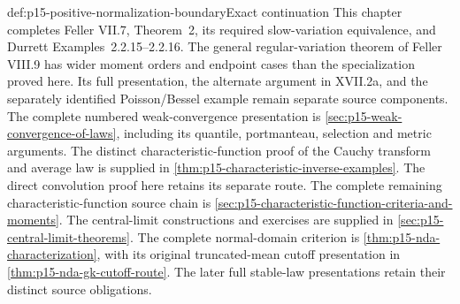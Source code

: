 \begin{proofboundary}{def:p15-positive-normalization-boundary}{Exact continuation}
This chapter completes Feller VII.7, Theorem~2, its required
slow-variation equivalence, and Durrett Examples~2.2.15--2.2.16.
The general regular-variation theorem of Feller VIII.9 has wider
moment orders and endpoint cases than the specialization proved here.
Its full presentation, the alternate argument in XVII.2a, and the
separately identified Poisson/Bessel example remain separate source
components. The complete numbered weak-convergence presentation is
\cref{sec:p15-weak-convergence-of-laws}, including its quantile,
portmanteau, selection and metric arguments.
The distinct characteristic-function proof of the Cauchy transform
and average law is supplied in
\cref{thm:p15-characteristic-inverse-examples}.
The direct convolution proof here retains its separate route.
The complete remaining characteristic-function source chain is
\cref{sec:p15-characteristic-function-criteria-and-moments}.
The central-limit constructions and exercises are supplied in
\cref{sec:p15-central-limit-theorems}. The complete normal-domain
criterion is \cref{thm:p15-nda-characterization}, with its original
truncated-mean cutoff presentation in \cref{thm:p15-nda-gk-cutoff-route}.
The later full stable-law presentations retain their distinct source
obligations.
\end{proofboundary}
